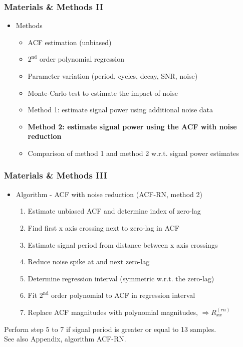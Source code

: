 \documentclass[11pt,aspectratio=169]{beamer}
\begin{document}
	\begin{frame}
		\frametitle{Materials \& Methods II}
		\begin{itemize}
			\setlength\itemsep{0.5em}
			\item \textcolor{RIPtitlecol}{Methods}
			\begin{itemize}
				\setlength\itemsep{0.5em}
				\item ACF estimation (unbiased)
				\item $2^{\text{nd}}$ order polynomial regression
				\item Parameter variation (period, cycles, decay, SNR, noise)
				\item Monte-Carlo test to estimate the impact of noise
				\item Method 1: estimate signal power using additional noise data
				\item \textbf{Method 2: estimate signal power using the ACF with noise reduction}
				\item Comparison of method 1 and method 2 w.r.t. signal power estimates
			\end{itemize}
		\end{itemize}
	\end{frame}
	\begin{frame}
		\frametitle{Materials \& Methods III}
		\begin{itemize}
			\setlength\itemsep{0.5em}
			\item \textcolor{RIPtitlecol}{Algorithm - ACF with noise reduction (ACF-RN, method 2)}
			\begin{enumerate}
				\setlength\itemsep{0.5em}
				\item Estimate unbiased ACF and determine index of zero-lag
				\item Find first x axis crossing next to zero-lag in ACF
				\item Estimate signal period from distance between x axis crossings
				\item Reduce noise spike at and next zero-lag
				\item Determine regression interval (symmetric w.r.t. the zero-lag)
				\item Fit $2^{\text{nd}}$ order polynomial to ACF in regression interval
				\item Replace ACF magnitudes with polynomial magnitudes, $\Rightarrow R_{xx}^{(rn)}$
			\end{enumerate}
		\end{itemize}
		\vspace*{.5em}
		\small Perform step 5 to 7 if signal period is greater or equal to 13 samples.\\
		See also Appendix, algorithm ACF-RN.
	\end{frame}
\end{document}
